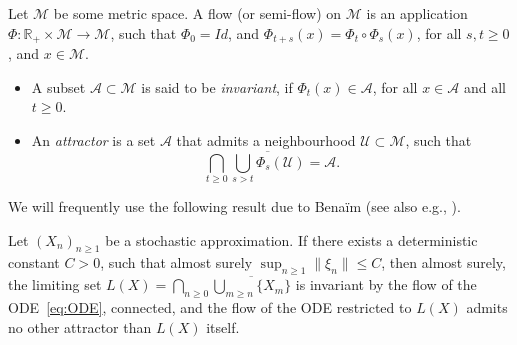 \begin{definition}
Let $\mathcal M$ be some metric space.
A flow (or semi-flow) on $\mathcal M$ is an application $\Phi:\mathbb R_+\times \mathcal M \to \mathcal M$, such that $\Phi_0 = Id$, and $\Phi_{t+s}(x) = \Phi_t \circ \Phi_s(x)$, for all $s,t\ge 0$, and $x\in \mathcal M$.
\begin{itemize}
\item A subset $\mathcal A\subset \mathcal M$ is said {to be} \emph{invariant}, if $\Phi_t(x) \in \mathcal A$, for all $x\in \mathcal A$ and all $t\ge 0$.
\item An \emph{attractor} is a set $\mathcal A$ that admits a neighbourhood $\mathcal U\subset \mathcal M$, such that
\[
\bigcap_{t\geq 0}\overline{\bigcup_{s>t} \Phi_s(\mathcal U)} = \mathcal A.
\]
\end{itemize}
\end{definition}
We will frequently use the following result due to Benaïm \cite[Prop.\,4.1, Rem.\,4.5, Prop.\,5.3, Th.\,5.7]{Benaim} (see also e.g., \cite[Prop.\,2.10 \& Th.\,2.15]{Pemantle}).
\begin{theorem}\label{th:pemantle}
Let $(X_n)_{n\geq 1}$ be a stochastic approximation.
If there exists a deterministic constant $C>0$, such that almost surely $\sup_{n\geq 1}\|\xi_n\| \le C$,
then almost surely, the limiting set $L(X) = \bigcap_{n\geq 0} \overline{\bigcup_{m\geq n} \{X_m\}}$ is invariant by the flow of the ODE~\eqref{eq:ODE}, connected, and the flow of the ODE restricted to $L(X)$ admits no other attractor than $L(X)$ itself.
\end{theorem}

